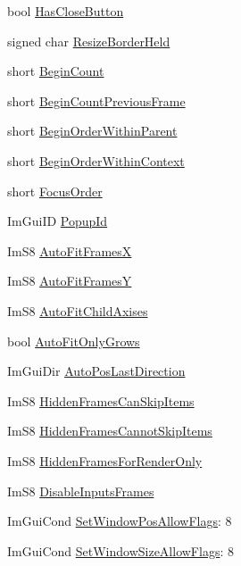 \begin{DoxyCompactItemize}
bool \hyperlink{structImGuiWindow_aebe637a230800210ba67cd8cdd9e71de}{Has\+Close\+Button}
\item 
signed char \hyperlink{structImGuiWindow_a2f7c042fc7e8359d4736cab69fff8490}{Resize\+Border\+Held}
\item 
short \hyperlink{structImGuiWindow_a045526cada44318c4b02ef7e5a80b8af}{Begin\+Count}
\item 
short \hyperlink{structImGuiWindow_a182d724214f2a599feda5dc7ab261115}{Begin\+Count\+Previous\+Frame}
\item 
short \hyperlink{structImGuiWindow_aa7042ce8e41ae11f0100fee9e25dbf38}{Begin\+Order\+Within\+Parent}
\item 
short \hyperlink{structImGuiWindow_af6a2e24ba9291d538d1af269133fec72}{Begin\+Order\+Within\+Context}
\item 
short \hyperlink{structImGuiWindow_a64b10337c3a5a87d9c5cd8683206dbea}{Focus\+Order}
\item 
Im\+Gui\+ID \hyperlink{structImGuiWindow_a319c5f43fa4ee9c76b8a6e551e0c0869}{Popup\+Id}
\item 
Im\+S8 \hyperlink{structImGuiWindow_a6d4f86b634dd0fc124e216282b5a110c}{Auto\+Fit\+FramesX}
\item 
Im\+S8 \hyperlink{structImGuiWindow_a134c07e0db4129ee43fafb1937429839}{Auto\+Fit\+FramesY}
\item 
Im\+S8 \hyperlink{structImGuiWindow_aea6c6eca60515ed1a5afd5d0c1f8601c}{Auto\+Fit\+Child\+Axises}
\item 
bool \hyperlink{structImGuiWindow_a3583d20a57fea8c8491f14f2dcda483c}{Auto\+Fit\+Only\+Grows}
\item 
Im\+Gui\+Dir \hyperlink{structImGuiWindow_aa8219e984ed273d6cfd19fb4b93eff5e}{Auto\+Pos\+Last\+Direction}
\item 
Im\+S8 \hyperlink{structImGuiWindow_af1d2d851f229310e1c9bfdaaa792500e}{Hidden\+Frames\+Can\+Skip\+Items}
\item 
Im\+S8 \hyperlink{structImGuiWindow_a7756e042598a3fd79830288ef04c3e4c}{Hidden\+Frames\+Cannot\+Skip\+Items}
\item 
Im\+S8 \hyperlink{structImGuiWindow_a6439e813f1f2b40b81cba70e86b46d41}{Hidden\+Frames\+For\+Render\+Only}
\item 
Im\+S8 \hyperlink{structImGuiWindow_a2dc5fd6454d55972d9995d3e0dfc9c5a}{Disable\+Inputs\+Frames}
\item 
Im\+Gui\+Cond \hyperlink{structImGuiWindow_a8ff69a8bdc9221c9cc7d8ba656013d84}{Set\+Window\+Pos\+Allow\+Flags}\+: 8
\item 
Im\+Gui\+Cond \hyperlink{structImGuiWindow_a0c9419d95253214cb2a71d6ead1e03d6}{Set\+Window\+Size\+Allow\+Flags}\+: 8

\end{DoxyCompactItemize}
